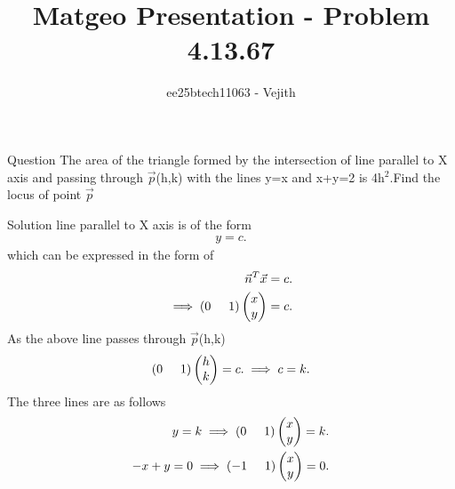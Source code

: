 \documentclass{beamer}
\title{Matgeo Presentation - Problem 4.13.67}
\author{ee25btech11063 - Vejith}
\numberwithin{equation}{section}
\providecommand{\brak}[1]{\ensuremath{\left(#1\right)}}
\theoremstyle{remark}
\newcommand{\myvec}[1]{\ensuremath{\begin{pmatrix}#1\end{pmatrix}}}
\begin{document}
\frame{\titlepage}
\begin{frame}{Question}
The area of the triangle formed by the intersection of line parallel to X axis and passing through $\Vec{p}$(h,k) with the lines y=x and x+y=2 is 4h$^2$.Find the locus of point $\Vec{p}$
\end{frame}

\begin{frame}{Solution}
   line parallel to X axis is of the form 
\begin{align}
    y=c.
\end{align}
which can be expressed in the form of 
\begin{align}
    \Vec{n}^T\Vec{x}=c.\\
     \implies \brak{0\hspace{0.5cm}1}\myvec{x\\y}=c.
\end{align}
As the above line passes through $\Vec{p}$(h,k)
\begin{align}
     \brak{0\hspace{0.5cm}1}\myvec{h\\k}=c.
     \implies c=k.
\end{align}
The three lines are as follows
\begin{align}
    y=k\implies \brak{0\hspace{0.5cm}1}\myvec{x\\y}=k.\\
    -x+y=0 \implies \brak{-1\hspace{0.5cm}1}\myvec{x\\y}=0.\\
    \end{align}
    \end{frame}
\end{document}
